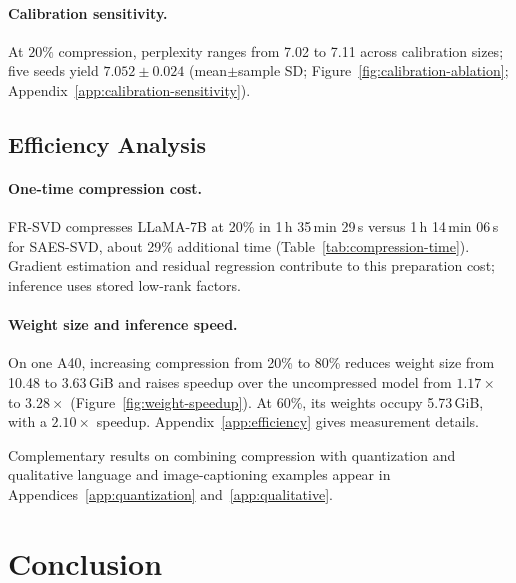 \documentclass[11pt]{article}
\begin{document}


\paragraph{Calibration sensitivity.}


At $20\%$ compression, perplexity ranges from 7.02 to 7.11 across calibration sizes; five seeds yield $7.052\pm0.024$ (mean$\pm$sample SD; Figure~\ref{fig:calibration-ablation}; Appendix~\ref{app:calibration-sensitivity}).

\subsection{Efficiency Analysis}\label{sec:efficiency}

\paragraph{One-time compression cost.}


FR-SVD compresses LLaMA-7B at 20\% in 1\,h 35\,min 29\,s versus 1\,h 14\,min 06\,s for SAES-SVD, about 29\% additional time (Table~\ref{tab:compression-time}). Gradient estimation and residual regression contribute to this preparation cost; inference uses stored low-rank factors.

\paragraph{Weight size and inference speed.}
On one A40, increasing compression from 20\% to 80\% reduces weight size from 10.48 to 3.63\,GiB and raises speedup over the uncompressed model from $1.17\times$ to $3.28\times$ (Figure~\ref{fig:weight-speedup}). At 60\%, its weights occupy 5.73\,GiB, with a $2.10\times$ speedup. Appendix~\ref{app:efficiency} gives measurement details.



Complementary results on combining compression with quantization and qualitative language and image-captioning examples appear in Appendices~\ref{app:quantization} and~\ref{app:qualitative}.

\section{Conclusion}\label{sec:conclusion}
\end{document}
